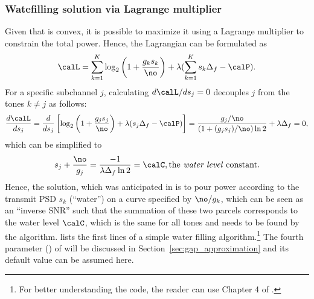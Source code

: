 %

\subsubsection{Watefilling solution via Lagrange multiplier}

Given that  is convex, it is possible to maximize it using a Lagrange multiplier to constrain the total power. Hence, the Lagrangian can be formulated as
$$
\calL = \sum_{k=1}^K \log_2 \left(1 + \frac{g_{k} s_k}{\no}\right) + \lambda (\sum_{k=1}^K s_k \Delta_f - \calP).
$$
For a specific subchannel $j$, calculating $d \calL/ds_j = 0$ decouples $j$ from the tones $k \ne j$ as follows:
\[
\frac{d \calL}{ds_j} = \frac{d}{ds_j} \left[ \log_2 \left(1 + \frac{g_{j} s_j}{\no}\right) + \lambda ( s_j \Delta_f - \calP) \right] = \frac{g_j / \no}{\left( 1 + (g_j s_j)/\no \right) \ln 2} + \lambda \Delta_f =0,
\]
which can be simplified to
\begin{equation}
s_j +  \frac {\no} {g_j} = \frac{-1}{\lambda \Delta_f \ln 2} = \calC, \textrm{the \emph{water level} constant}.	
	\label{eq:waterfill}
\end{equation}
Hence, the solution, which was anticipated in  is to pour power according to the transmit PSD $s_k$ (``water'') on a curve specified by $\no / g_k$, which can be seen as an ``inverse SNR'' such that the summation of these two parcels corresponds to the water level $\calC$, which is the same for all tones and needs to be found by the algorithm.
 lists the first lines of a simple water filling algorithm.\footnote{For better understanding the code, the reader can use Chapter 4 of \cite{Ciofficn}.} The fourth parameter () of  will be discussed in Section~\ref{sec:gap_approximation} and its default value can be assumed here.




%

